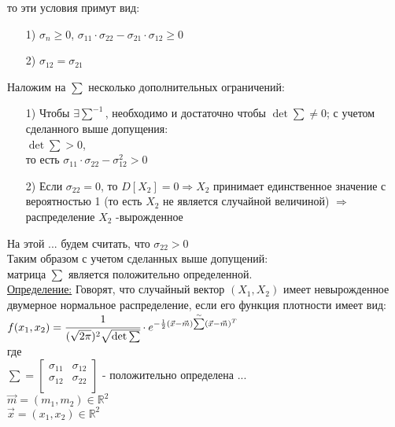то эти условия примут вид:\\
\begin{enumerate}
	\item[1)] $\sigma_n \geqslant 0$, $\sigma_{11} \cdot \sigma_{22} - \sigma_{21} \cdot \sigma_{12} \geqslant 0$
	
	\item[2)] $\sigma_{12} = \sigma_{21}$
\end{enumerate}
Наложим на $\sum$ несколько дополнительных ограничений:\\
\begin{enumerate}
	\item[1)] Чтобы $\exists \sum^{-1}$, необходимо и достаточно чтобы $\det{\sum} \neq 0$; с учетом сделанного выше допущения:\\
	$\det{\sum} > 0$,\\
	то есть $\sigma_{11} \cdot \sigma_{22} - \sigma_{12}^2 > 0$\\ %
	
	\item[2)] Если $\sigma_{22} = 0$, то $D[X_2] = 0 \Rightarrow X_2$ принимает единственное значение с вероятностью 1 (то есть $X_2$ не является случайной величиной) $\Rightarrow$ распределение $X_2$ -вырожденное
\end{enumerate}


На этой ... будем считать, что $\sigma_{22} > 0$\\
Таким образом с учетом сделанных выше допущений:\\
матрица $\sum$ является положительно определенной.
\\
\underline{Определение:} Говорят, что случайный вектор $(X_1, X_2)$ имеет невырожденное двумерное нормальное распределение, если его функция плотности имеет вид:\\
$f(x_1, x_2) = \cfrac{1}{(\sqrt{2\pi})^2 \sqrt{\det{\sum}}} \cdot e^{-\frac12 (\vec{x} - \vec{m}) \overset{\sim}{\sum} (\vec{x} - \vec{m})^T}$\\
где\\
$\sum = 
\begin{bmatrix}
	\sigma_{11}	&	\sigma_{12}	\\
	\sigma_{12}	&	\sigma_{22}	\\
\end{bmatrix}$ - положительно определена ...\\
$\vec{m} = (m_1, m_2) \in \mathbb{R}^2$\\
$\vec{x} = (x_1, x_2) \in \mathbb{R}^2$\\


